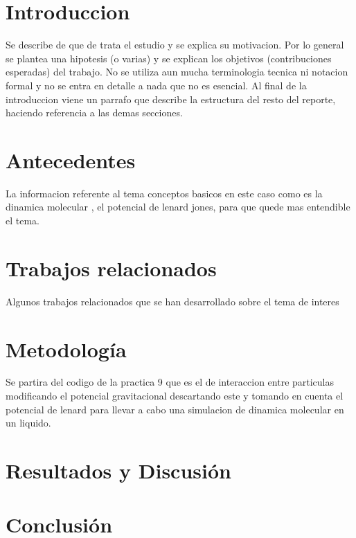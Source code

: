 \documentclass[10pt,twocolumn]{article}
\begin{document}


\section{Introduccion}\label{intro}

 Se describe de que de trata el estudio y se explica su motivacion. Por lo general se plantea una hipotesis (o varias) y se explican los objetivos (contribuciones esperadas) del trabajo. No se utiliza aun mucha terminologia tecnica ni notacion formal y no se entra en detalle a nada que no es esencial. Al final de la introduccion viene un parrafo que describe la estructura del resto del reporte, haciendo referencia a las demas secciones.

\section{Antecedentes}\label{antes}
 La informacion referente al tema conceptos basicos en este caso como es la dinamica molecular , el potencial de lenard jones, para que quede mas entendible el tema. 

\section{Trabajos relacionados}\label{trabajos}
Algunos trabajos relacionados que se han desarrollado sobre el tema de interes

\section{Metodolog\'{i}a}\label{met}
Se partira del codigo de la practica 9 que es el de interaccion entre particulas modificando el potencial gravitacional descartando este y tomando en cuenta el potencial de lenard para llevar a cabo una simulacion de dinamica molecular en un liquido.

\section{Resultados y Discusi\'{o}n}\label{res}



\section{Conclusi\'{o}n}\label{con}


  
  
\end{document}
